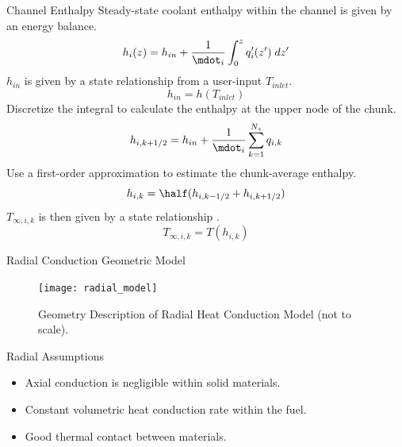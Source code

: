 \begin{frame}{Channel Enthalpy}
  Steady-state coolant enthalpy within the channel is given by an energy
  balance.
  \begin{equation}
    \label{eq:continuous_heat_balance}
    h_i(z) = h_{in} + \frac{1}{\mdot_i} \int_0^z q'_i(z') \; dz'
  \end{equation}
  $h_{in}$ is given by a state relationship from a user-input $T_{inlet}$.
  \begin{equation}
    h_{in} = h(T_{inlet})
  \end{equation}
  Discretize the integral to calculate the enthalpy at the upper node of the
  chunk.
  \begin{equation}
    h_{i,k+1/2} = h_{in} + \frac{1}{\mdot_i} \sum_{k=1}^{N_z} q_{i,k}
  \end{equation}
  Use a first-order approximation to estimate the chunk-average enthalpy.
  \begin{equation}
    h_{i,k} = \half (h_{i,k-1/2}+h_{i,k+1/2})
  \end{equation}
  $T_{\infty,i,k}$ is then given by a state relationship \cite{sodiumProp}.
  \begin{equation}
    T_{\infty,i,k} = T(h_{i,k})
  \end{equation}
\end{frame}

\begin{frame}{Radial Conduction Geometric Model}
  \begin{figure}
    \centering
    \texttt{[image: radial\_model]}
    \caption{Geometry Description of Radial Heat Conduction Model (not to
      scale).}
    \label{fig:radial_model}
  \end{figure}
\end{frame}

\begin{frame}{Radial Assumptions}
  \begin{itemize}
    \item Axial conduction is negligible within solid materials.
    \item Constant volumetric heat conduction rate within the fuel.
    \item Good thermal contact between materials.
  \end{itemize}
\end{frame}

